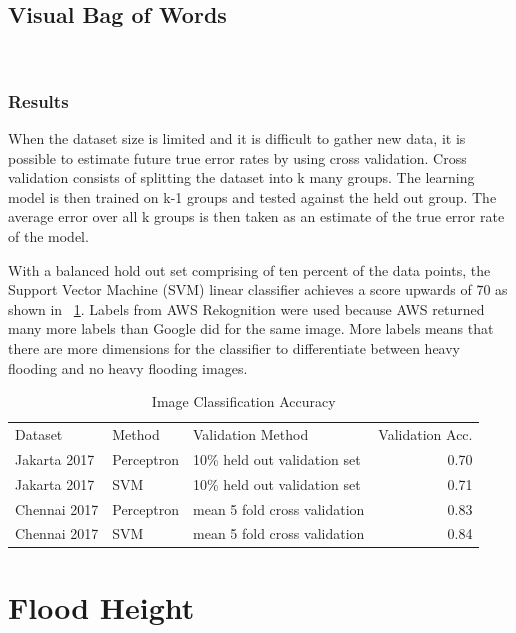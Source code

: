 \subsection{Visual Bag of Words}

~\cite{yangEvaluatingBagofvisualwordsRepresentations2007}


\subsubsection{Results}
When the dataset size is limited and it is difficult to gather new data, 
it is possible to estimate future true error rates by using
cross validation. Cross validation consists of splitting the dataset into
k many groups. The learning model is then trained on k-1 groups and tested 
against the held out group. The average error over all k groups is then 
taken as an estimate of the true error rate of the model.

With a balanced hold out set comprising of ten percent of the
data points, the Support Vector Machine (SVM) linear classifier achieves a score
upwards of \.70 as shown in \tablename{}~\ref{chap4:imageSvmPerceptron}.
Labels from AWS Rekognition were used because AWS returned many more labels than 
Google did for the same image. More labels means that there are more dimensions
for the classifier to differentiate between heavy flooding and no heavy flooding
images.

\begin{table}[htbp]
\caption{Image Classification Accuracy}
\label{chap4:imageSvmPerceptron}
\begin{tabular}{lllr}
\toprule
      Dataset &      Method &           Validation Method &  Validation Acc. \\
 Jakarta 2017 &  Perceptron &     10\% held out validation set &             0.70 \\
\midrule
 Jakarta 2017 &         SVM &     10\% held out validation set &             0.71 \\
 Chennai 2017 &  Perceptron &  mean 5 fold cross validation &             0.83 \\
 Chennai 2017 &         SVM &  mean 5 fold cross validation &             0.84 \\
\bottomrule
\end{tabular}
\end{table}


\section{Flood Height}
